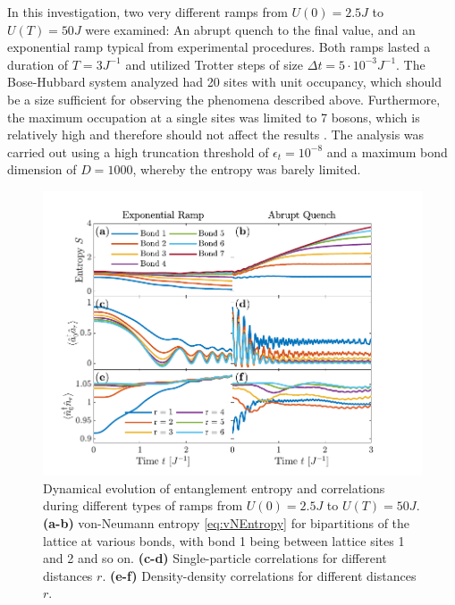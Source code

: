 In this investigation, two very different ramps from $U(0) = 2.5 J$ to $U(T) = 50 J$ were examined: An abrupt quench to the final value, and an exponential ramp typical from experimental procedures. Both ramps lasted a duration of $T = 3 J^{-1}$ and utilized Trotter steps of size $\Delta t = 5 \cdot 10^{-3} J^{-1}$. The Bose-Hubbard system analyzed had 20 sites with unit occupancy, which should be a size sufficient for observing the phenomena described above. Furthermore, the maximum occupation at a single sites was limited to 7 bosons, which is relatively high and therefore should not affect the results \cite{Braun2015}. The analysis was carried out using a high truncation threshold of $\epsilon_t = 10^{-8}$ and a maximum bond dimension of $D = 1000$, whereby the entropy was barely limited.\\
\begin{figure}[h!]
    \centering
    \includegraphics[width=\textwidth]{Figures/L20/EntanglementGrowth.pdf}
    \caption{Dynamical evolution of entanglement entropy and correlations during different types of ramps from $U(0) = 2.5 J$ to $U(T) = 50 J$. \textbf{(a-b)} von-Neumann entropy \eqref{eq:vNEntropy} for bipartitions of the lattice at various bonds, with bond 1 being between lattice sites 1 and 2 and so on. \textbf{(c-d)} Single-particle correlations for different distances $r$. \textbf{(e-f)} Density-density correlations for different distances $r$.}
    \label{fig:EntanglementGrowth}
\end{figure}

